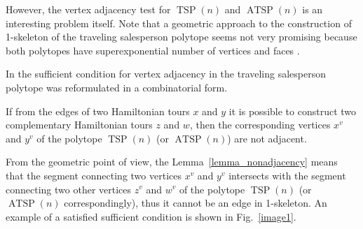 \documentclass[runningheads]{llncs}
\DeclareMathOperator\TSP {TSP}
\DeclareMathOperator\ATSP {ATSP}
\begin{document}
However, the vertex adjacency test for $\TSP(n)$ and $\ATSP(n)$ is an interesting problem itself. Note that a geometric approach to the construction of 1-skeleton of the traveling salesperson polytope seems not very promising because both polytopes have superexponential number of vertices and faces \cite{Fiorini,Grotschel}.

In \cite{Rao} the sufficient condition for vertex adjacency in the traveling salesperson polytope was reformulated in a combinatorial form.

\begin{lemma} \label{lemma_nonadjacency}
	If from the edges of \break
	two Hamiltonian tours $x$ and $y$ it is possible to construct two complementary Hamiltonian tours $z$ and $w$, then the corresponding vertices $x^v$ and $y^v$ of the polytope $\TSP(n)$ (or $\ATSP(n)$) are not adjacent. %
\end{lemma}

From the geometric point of view, the Lemma~\ref{lemma_nonadjacency} means that the segment connecting two vertices $x^v$ and $y^v$ intersects with the segment connecting two other vertices $z^v$ and $w^v$ of the polytope $\TSP(n)$ (or $\ATSP(n)$ correspondingly), thus it cannot be an edge in 1-skeleton. An example of a satisfied sufficient condition is shown in Fig.~\ref{image1}. %
\end{document}

